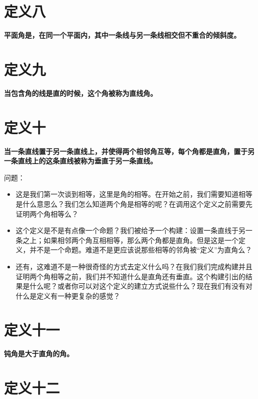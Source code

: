 \documentclass[
]{book}
\begin{document}
\hypertarget{ux5b9aux4e49ux516b}{%
\section{定义八}\label{ux5b9aux4e49ux516b}}

\textbf{平面角是，在同一个平面内，其中一条线与另一条线相交但不重合的倾斜度。}

\hypertarget{ux5b9aux4e49ux4e5d}{%
\section{定义九}\label{ux5b9aux4e49ux4e5d}}

\textbf{当包含角的线是直的时候，这个角被称为直线角。}

\hypertarget{ux5b9aux4e49ux5341}{%
\section{定义十}\label{ux5b9aux4e49ux5341}}

\textbf{当一条直线置于另一条直线上，并使得两个相邻角互等，每个角都是直角，置于另一条直线上的这条直线被称为垂直于另一条直线。}

问题：

\begin{itemize}
\item
  这是我们第一次谈到相等，这里是角的相等。在开始之前，我们需要知道相等是什么意思么？我们怎么知道两个角是相等的呢？在调用这个定义之前需要先证明两个角相等么？
\item
  这个定义是不是有点像一个命题？我们被给予一个构建：设置一条直线于另一条之上；如果相邻两个角互相相等，那么两个角都是直角。但是这是一个定义，并不是一个命题。难道不是更应该说那些相等的邻角被``定义''为直角么？
\item
  还有，这难道不是一种很奇怪的方式去定义什么吗？在我们我们完成构建并且证明两个角相等之前，我们并不知道什么是直角还有垂直。这个构建引出的结果是什么呢？或者你可以对这个定义的建立方式说些什么？现在我们有没有对什么是定义有一种更复杂的感觉？
\end{itemize}

\hypertarget{ux5b9aux4e49ux5341ux4e00}{%
\section{定义十一}\label{ux5b9aux4e49ux5341ux4e00}}

\textbf{钝角是大于直角的角。}

\hypertarget{ux5b9aux4e49ux5341ux4e8c}{%
\section{定义十二}\label{ux5b9aux4e49ux5341ux4e8c}}
\end{document}
